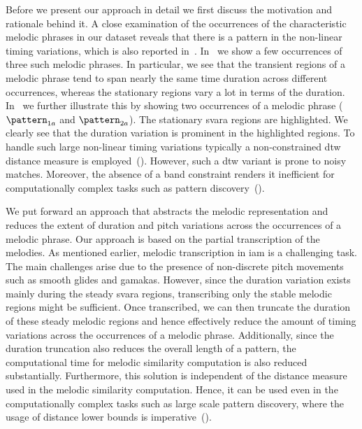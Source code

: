 Before we present our approach in detail we first discuss the motivation and rationale behind it. A close examination of the occurrences of the characteristic melodic phrases in our dataset reveals that there is a pattern in the non-linear timing variations, which is also reported in~\cite{Rao2014}. In~ we show a few occurrences of three such melodic phrases. In particular, we see that the transient regions of a melodic phrase tend to span nearly the same time duration across different occurrences, whereas the stationary regions vary a lot in terms of the duration. In~ we further illustrate this by showing two occurrences of a melodic phrase ($\pattern_{1a}$ and $\pattern_{2a}$). The stationary \gls{svara} regions are highlighted. We clearly see that the duration variation is prominent in the highlighted regions. To handle such large non-linear timing variations typically a non-constrained \gls{dtw} distance measure is employed~(). However, such a \gls{dtw} variant is prone to noisy matches. Moreover, the absence of a band constraint renders it inefficient for computationally complex tasks such as pattern discovery~().



We put forward an approach that abstracts the melodic representation and reduces the extent of duration and pitch variations across the occurrences of a melodic phrase. Our approach is based on the partial transcription of the melodies. As mentioned earlier, melodic transcription in \gls{iam} is a challenging task. The main challenges arise due to the presence of non-discrete pitch movements such as smooth glides and \glspl{gamaka}. However, since the duration variation exists mainly during the steady \gls{svara} regions, transcribing only the stable melodic regions might be sufficient. Once transcribed, we can then truncate the duration of these steady melodic regions and hence effectively reduce the amount of timing variations across the occurrences of a melodic phrase. Additionally, since the duration truncation also reduces the overall length of a pattern, the computational time for melodic similarity computation is also reduced substantially. Furthermore, this solution is independent of the distance measure used in the melodic similarity computation. Hence, it can be used even in the computationally complex tasks such as large scale pattern discovery, where the usage of distance lower bounds is imperative~().


